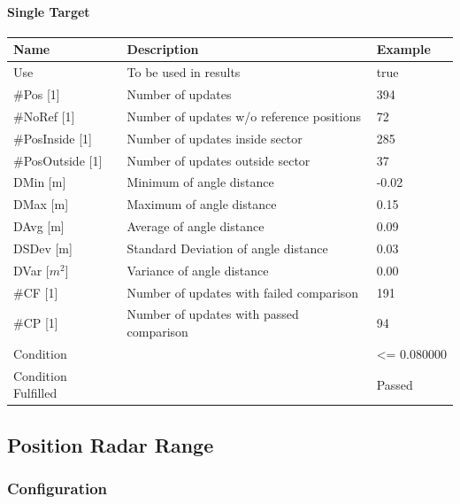 \paragraph{Single Target}

\begin{center}
 \begin{table}[H]
  \begin{tabularx}{\textwidth}{ | l | X |  l | }
    \hline
    \textbf{Name} & \textbf{Description} & \textbf{Example} \\ \hline
    Use & To be used in results & true \\ \hline
    \#Pos [1] & Number of updates & 394 \\ \hline
    \#NoRef [1] & Number of updates w/o reference positions & 72 \\ \hline
    \#PosInside [1] & Number of updates inside sector & 285 \\ \hline
    \#PosOutside [1] & Number of updates outside sector & 37 \\ \hline
    DMin [m] & Minimum of angle distance & -0.02 \\ \hline
    DMax [m] & Maximum of angle distance & 0.15 \\ \hline
    DAvg [m] & Average of angle distance & 0.09 \\ \hline
    DSDev [m] & Standard Deviation of angle distance & 0.03 \\ \hline
    DVar [$m^2$] & Variance of angle distance & 0.00 \\ \hline
    \#CF [1] & Number of updates with failed comparison & 191 \\ \hline
    \#CP [1] & Number of updates with passed comparison & 94 \\ \hline
    Condition &  & <= 0.080000 \\ \hline
    Condition Fulfilled &  & Passed \\ \hline
\end{tabularx}
\end{table}
\end{center}


\subsection{Position Radar Range}
\label{sec:eval_req_pos_radar_rng} 

\subsubsection{Configuration}

